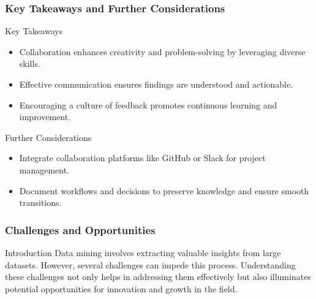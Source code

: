 \documentclass[aspectratio=169]{beamer}
\begin{document}
\begin{frame}[fragile]
    \frametitle{Key Takeaways and Further Considerations}
    \begin{block}{Key Takeaways}
        \begin{itemize}
            \item Collaboration enhances creativity and problem-solving by leveraging diverse skills.
            \item Effective communication ensures findings are understood and actionable.
            \item Encouraging a culture of feedback promotes continuous learning and improvement.
        \end{itemize}
    \end{block}
    \begin{block}{Further Considerations}
        \begin{itemize}
            \item Integrate collaboration platforms like GitHub or Slack for project management.
            \item Document workflows and decisions to preserve knowledge and ensure smooth transitions.
        \end{itemize}
    \end{block}
\end{frame}

\begin{frame}[fragile]
    \frametitle{Challenges and Opportunities}
    \begin{block}{Introduction}
        Data mining involves extracting valuable insights from large datasets. However, several challenges can impede this process. Understanding these challenges not only helps in addressing them effectively but also illuminates potential opportunities for innovation and growth in the field.
    \end{block}
\end{frame}
\end{document}
